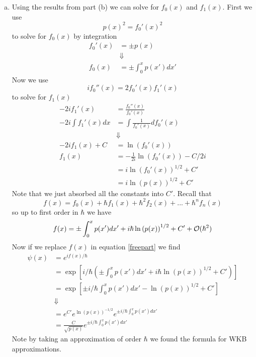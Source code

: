 \documentclass[11pt]{article}
\numberwithin{equation}{section}
\begin{document}
\begin{enumerate}[(a)]
\item
Using the results from part (b) we can solve for $f_0(x)$ and $f_1(x)$. First we use 
$$p(x)^2 = f_0'(x)^2$$
to solve for $f_0(x)$ by integration
\begin{align*}
f_0'(x) &= \pm p(x)\\
&\Downarrow\\
f_0(x) &= \pm\int_{0}^{x} p(x')dx'
\end{align*}
Now we use
$$if_0''(x) = 2f_0'(x)f_1'(x)$$
to solve for $f_1(x)$ 
\begin{align*}
-2if_1'(x) &= \frac{f_0''(x)}{f_0'(x)} \\
-2i\int f_1'(x)dx &= \int\frac{1}{f_0'(x)}df_0'(x) \\
&\Downarrow\\
-2if_1(x) + C &= \ln(f_0'(x))\\
f_1(x) &= -\frac{1}{2i}\ln(f_0'(x)) - C/2i\\
&= i\ln\left(f_0'(x)\right)^{1/2} + C'\\
&= i\ln\left(p(x)\right)^{1/2} + C'
\end{align*}
Note that we just absorbed all the constants into $C'$. Recall that
$$f(x) = f_0(x) + \hbar f_1(x) + \hbar^2 f_2(x) + ... + \hbar^n f_n(x)$$
so up to first order in $\hbar$ we have
$$f(x) =  \pm\int_{0}^{x} p(x')dx' + i\hbar\ln\left(p(x)\right)^{1/2} + C'+ \mathcal{O}(\hbar^2)$$
Now if we replace $f(x)$ in equation \ref{freepart} we find
\begin{align*}
\psi(x) &= e^{if(x)/\hbar}\\
&= \exp\left[i/\hbar\left(\pm\int_{0}^{x} p(x')dx' + i\hbar\ln\left(p(x)\right)^{1/2} + C'\right)\right]\\
&= \exp\left[\pm i/\hbar\int_{0}^{x} p(x')dx' - \ln\left(p(x)\right)^{1/2} + C'\right]\\
&\Downarrow\\
&= e^{C'}e^{\ln\left(p(x)\right)^{-1/2}}e^{\pm i/\hbar\int_{0}^{x} p(x')dx'}\\
&= \frac{C}{\sqrt{p(x)}}e^{\pm i/\hbar\int_{0}^{x} p(x')dx'}
\end{align*}
Note by taking an approximation of order $\hbar$ we found the formula for WKB approximations.
\end{enumerate}
\end{document}
